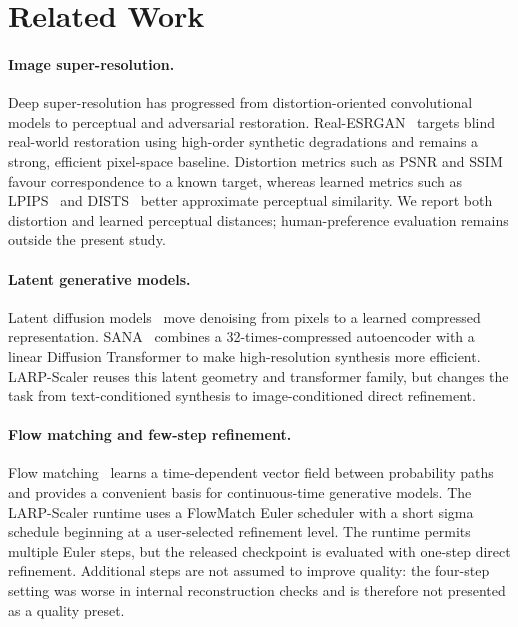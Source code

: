 \documentclass[10pt]{article}
\newcommand{\method}{LARP-Scaler\xspace}
\begin{document}
\section{Related Work}
\label{sec:related}

\paragraph{Image super-resolution.}
Deep super-resolution has progressed from distortion-oriented convolutional
models to perceptual and adversarial restoration. Real-ESRGAN~\cite{wang2021realesrgan}
targets blind real-world restoration using high-order synthetic degradations
and remains a strong, efficient pixel-space baseline. Distortion metrics such
as PSNR and SSIM~\cite{wang2004ssim} favour correspondence to a known target,
whereas learned metrics such as LPIPS~\cite{zhang2018lpips} and
DISTS~\cite{ding2020dists} better approximate perceptual similarity. We report
both distortion and learned perceptual distances; human-preference evaluation
remains outside the present study.

\paragraph{Latent generative models.}
Latent diffusion models~\cite{rombach2022ldm} move denoising from pixels to a
learned compressed representation. SANA~\cite{xie2025sana} combines a
32-times-compressed autoencoder with a linear Diffusion Transformer to make
high-resolution synthesis more efficient. \method reuses this latent geometry
and transformer family, but changes the task from text-conditioned synthesis
to image-conditioned direct refinement.

\paragraph{Flow matching and few-step refinement.}
Flow matching~\cite{lipman2023flow} learns a time-dependent vector field
between probability paths and provides a convenient basis for continuous-time
generative models. The \method runtime uses a FlowMatch Euler scheduler with a
short sigma schedule beginning at a user-selected refinement level. The
runtime permits multiple Euler steps, but the released checkpoint is evaluated
with one-step direct refinement. Additional steps are not assumed to improve
quality: the four-step setting was worse in internal reconstruction checks and
is therefore not presented as a quality preset.
\end{document}
